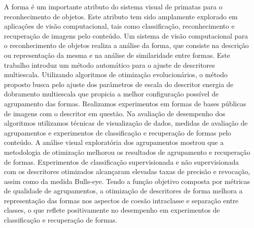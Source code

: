 A forma é um importante atributo do sistema visual de primatas para o reconhecimento de objetos. Este atributo tem sido amplamente explorado em  aplicações de visão computacional, tais como classificação, reconhecimento e recuperação de imagens pelo conteúdo. Um sistema de visão computacional para o reconhecimento de objetos realiza a análise da forma, que consiste na descrição ou representação da mesma e na análise de similaridade entre formas.  Este trabalho introduz um método automático para o ajuste de descritores multiescala. Utilizando algoritmos de otimização evolucionários, o método proposto busca pelo ajuste dos parâmetros de escala do descritor energia de dobramento multiescala que propicia a melhor configuração possível de agrupamento das formas. Realizamos experimentos em formas de bases públicas de imagens com o descritor em questão. Na avaliação de desempenho dos algoritmos utilizamos técnicas de visualização de dados, medidas de avaliação de agrupamentos e experimentos de classificação e recuperação de formas pelo conteúdo. A análise visual exploratória dos agrupamentos mostrou que a metodologia de otimização melhorou os resultados de agrupamento e recuperação de formas. Experimentos de classificação supervisionada e não supervisionada com os descritores otimizados alcançaram elevadas taxas de precisão e revocação, assim como da medida Bulls-eye. Tendo a função objetivo composta por métricas de qualidade de agrupamentos, a otimização de descritores de forma melhora a representação das formas nos aspectos de coesão intraclasse e separação entre classes, o que reflete positivamente no desempenho em experimentos de classificação e recuperação de formas.
